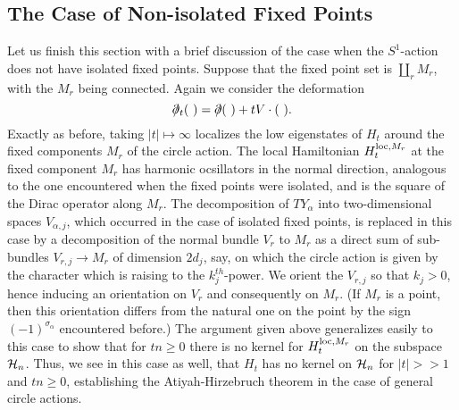 \subsection{The Case of Non-isolated Fixed Points}

Let us finish this section with a brief discussion of the case when
the $S^1$-action does not have isolated fixed points.  Suppose that
the fixed point set is $\coprod_rM_r$, with the $M_r$ being
connected. Again we consider the 
deformation
$$\dirac_t(\ )=\dirac(\ )+tV\cdot(\ ).$$
Exactly as before, taking $|t|\mapsto \infty$ localizes the low
eigenstates of $H_t$ around the fixed 
components $M_r$ of the circle action. The local Hamiltonian
$H_t^{{\rm loc},M_r}$ at the 
fixed component $M_r$ has harmonic ocsillators  in the normal
direction, analogous to the one encountered when the fixed points were
isolated, and is the square of the Dirac operator along $M_r$.  
The decomposition of $TY_\alpha$ into two-dimensional spaces  
$V_{\alpha,j}$, which occurred in the
case of isolated fixed points,  is replaced in this case by a
decomposition of the normal bundle $V_r$ to $M_r$ as a  direct sum of
sub-bundles $V_{r,j}\to M_r$ of dimension $2d_j$, say, on which the 
circle action is given by the character which is raising to the
$k_j^{th}$-power. We orient the $V_{r,j}$ so that $k_j>0$, hence inducing
an orientation on $V_r$ and consequently on $M_r$.  (If $M_r$ is a
point, then this orientation differs from the natural one on the point
by the sign $(-1)^{\sigma_\alpha}$ encountered before.)
The argument given above generalizes easily to this case to show that
for $tn\ge 0$ there is no kernel for $H^{{\rm loc},M_r}_t$ on the
subspace ${\cal 
H}_n$. 
Thus, we see in this case as well, that $H_t$ has no kernel on ${\cal H}_n$
for $|t|>>1$ and $tn\ge 0$, establishing the Atiyah-Hirzebruch theorem
in the case of general circle actions.


